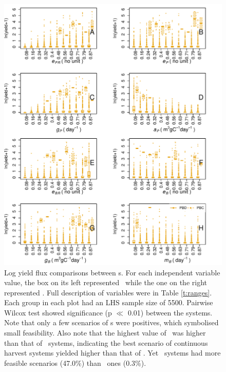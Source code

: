\documentclass[../thesis.tex]{subfiles} %
\begin{document}
\begin{figure}[H]
    \centering
    \includegraphics[width=.95\linewidth]{result/harvB.pdf}
    \caption[Log yield flux comparisons between \pbs s]{Log yield flux comparisons between \pbs s.  For each independent variable value, the box on its left represented \PBN\ while the one on the right represented \PBH.  Full description of variables were in Table \ref{t:ranges}.  Each group in each plot had an LHS sample size of 5500.  Pairwise Wilcox test showed significance (p $\ll$ 0.01) between the systems.  Note that only a few scenarios of \pbs s were positives, which symbolised small feasibility.  Also note that the highest value of \PBH\ was higher than that of \PBN\ systems, indicating the best scenario of continuous harvest systems yielded higher than that of \PBN.  Yet \PBN\ systems had more feasible scenarios (47.0\%) than \PBH\ ones (0.3\%).}
    \label{f:harvPB}
\end{figure}
\end{document}
